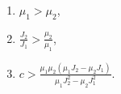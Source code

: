 \begin{enumerate}
	\item $\mu _1 > \mu _2$,
	\item $\frac{J_2}{J_1} > \frac{\mu _2}{\mu _1}$,
	\item $c >
	\frac{\mu _1\mu _2(\mu _1J_2 - \mu _2J_1)}{\mu _1J^2_2 - \mu _2J^2_1}$.
\end{enumerate}
